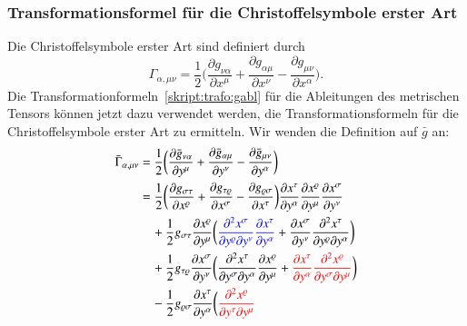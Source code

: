 \subsubsection{Transformationsformel für die Christoffelsymbole erster Art}
Die Christoffelsymbole erster Art sind definiert durch
\[
\Gamma_{\alpha,\mu\nu}
=
\frac12\biggl(
\frac{\partial g_{\nu\alpha}}{\partial x^\mu}
+
\frac{\partial g_{\alpha\mu}}{\partial x^\nu}
-
\frac{\partial g_{\mu\nu}}{\partial x^\alpha}
\biggr).
\]
Die Transformationformeln~\eqref{skript:trafo:gabl}
für die Ableitungen des metrischen Tensors können jetzt dazu verwendet
werden, die Transformationsformeln für die Christoffelsymbole erster Art
zu ermitteln.
Wir wenden die Definition auf $\bar g$ an:
\begin{align}
\bar\Gamma_{\alpha,\mu\nu}
&=
\frac12\biggl(
\frac{\partial \bar g_{\nu\alpha}}{\partial y^\mu}
+
\frac{\partial \bar g_{\alpha\mu}}{\partial y^\nu}
-
\frac{\partial \bar g_{\mu\nu}}{\partial y^\alpha}
\biggr)
\notag
\\
&=
\frac12\biggl(
\frac{\partial g_{\sigma\tau}}{\partial x^\varrho}
+
\frac{\partial g_{\tau\varrho}}{\partial x^\sigma}
-
\frac{\partial g_{\varrho\sigma}}{\partial x^\tau}
\biggr)
\frac{\partial x^\tau}{\partial y^\alpha}
\frac{\partial x^\varrho}{\partial y^\mu}
\frac{\partial x^\sigma}{\partial y^\nu}
\notag
\\
&\quad
+\frac12g_{\sigma\tau}
\frac{\partial x^\varrho}{\partial y^\mu}
\biggl(
{\color{blue}
\frac{\partial^2 x^\sigma}{\partial y^\varrho\partial y^\nu}
\frac{\partial x^\tau}{\partial y^\alpha}}
+
\frac{\partial x^\sigma}{\partial y^\nu}
\frac{\partial^2 x^\tau}{\partial y^\varrho\partial y^\alpha}
\biggr)
\notag
\\
&\quad
+\frac12g_{\tau\varrho}
\frac{\partial x^\sigma}{\partial y^\nu}
\biggl(
\frac{\partial^2 x^\tau}{\partial y^\sigma\partial y^\alpha}
\frac{\partial x^\varrho}{\partial y^\mu}
+
{\color{red}
\frac{\partial x^\tau}{\partial y^\alpha}
\frac{\partial^2 x^\varrho}{\partial y^\sigma\partial y^\mu}}
\biggr)
\notag
\\
&\quad
-\frac12g_{\varrho\sigma}
\frac{\partial x^\tau}{\partial y^\alpha}
\biggl(
{\color{red}
\frac{\partial^2 x^\varrho}{\partial y^\tau\partial y^\mu}
}
\end{align}
